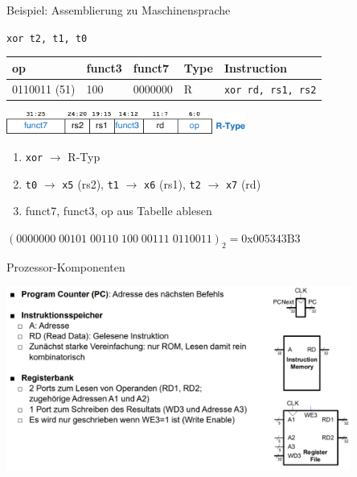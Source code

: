 \documentclass[
  german,            %
  aspectratio=169,    %
]{tumbeamer}
\begin{document}
\begin{frame}[c, fragile]{Beispiel: Assemblierung zu Maschinensprache}{}
	\begin{center}
		\large\texttt{xor t2, t1, t0}\\
		\scriptsize
		\begin{table}[]
			\begin{tabular}{|l|l|l|l|l|}
				\hline
				 \rowcolor[HTML]{0078C3}
				{\color{white}\textbf{op}} & {\color{white}\textbf{funct3}} & {\color{white}\textbf{funct7}} & {\color{white}\textbf{Type}} & {\color{white}\textbf{Instruction}} \\ \hline
				0110011 (51)               & 100                            & 0000000                        & R                            & \texttt{xor rd, rs1, rs2}           \\ \hline
			\end{tabular}
		\end{table}

		\includegraphics[width=0.59\textwidth]{w08_r_type.pdf}
	\end{center}

	\begin{enumerate}
		\item \texttt{xor} $\rightarrow$ R-Typ
		\item \texttt{t0} $\rightarrow$ \texttt{x5} (rs2), \texttt{t1} $\rightarrow$ \texttt{x6} (rs1), \texttt{t2} $\rightarrow$ \texttt{x7} (rd)
		\item funct7, funct3, op aus Tabelle ablesen
	\end{enumerate}
	\begin{center}
		\Large
		$(0000000\;00101\;00110\;100\;00111\;0110011)_2 = \textrm{0x005343B3}$
	\end{center}

\end{frame}

\begin{frame}[c, fragile]{Prozessor-Komponenten}{}
	\begin{center}
		\includegraphics[width=0.85\textwidth]{w08_prozessorcomponents1_lv.png}
	\end{center}
\end{frame}
\end{document}
